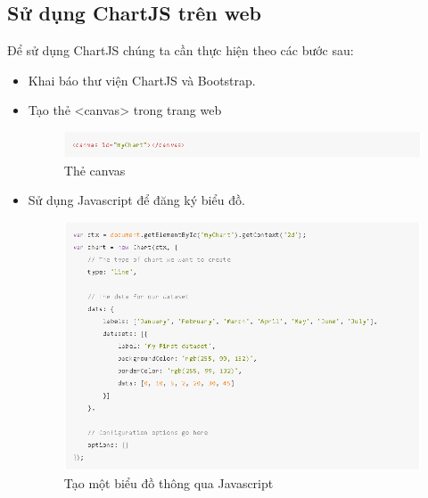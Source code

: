 \subsection{Sử dụng ChartJS trên web}
Để sử dụng ChartJS chúng ta cần thực hiện theo các bước sau: \cite{chartjs:3}
\begin{itemize}
	\item Khai báo thư viện ChartJS và Bootstrap.
	\item Tạo thẻ <canvas> trong trang web
	\begin{center}
		\begin{figure}[htp]
			\begin{center}
				\includegraphics[scale=1]{img/canvas}
			\end{center}
			\caption{Thẻ canvas}
			\label{refhinh8}
		\end{figure}
	\end{center}
	\item Sử dụng Javascript để đăng ký biểu đồ.
	\begin{center}
		\begin{figure}[htp]
			\begin{center}
				\includegraphics[scale=1]{img/chartjs}
			\end{center}
			\caption{Tạo một biểu đồ thông qua Javascript}
			\label{refhinh9}
		\end{figure}
	\end{center}
\end{itemize}